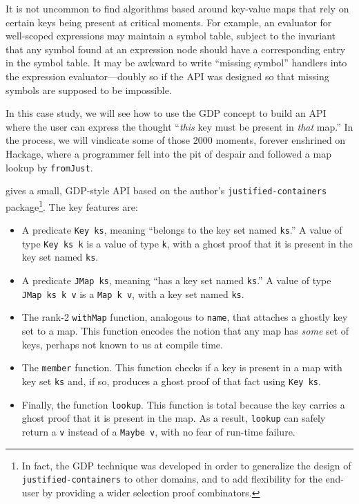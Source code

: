 \documentclass[format=sigplan, review=false, screen=true, 10pt]{acmart}
\begin{document}
It is not uncommon to find algorithms based around key-value maps that rely
on certain keys being present at critical moments. For example, an evaluator for
well-scoped expressions may maintain a symbol table, subject to the
invariant that any symbol found at an expression node should have a corresponding entry in the
symbol table. It may be awkward to write ``missing symbol'' handlers into the expression
evaluator---doubly so if the API was designed so that missing symbols are supposed to
be impossible.

In this case study, we will see how to use the GDP concept to build an API where the
user can express the thought ``\emph{this} key must be present in \emph{that} map.''
In the process, we will vindicate  some of those
2000 moments, forever enshrined on Hackage, where a programmer fell into
the pit of despair and followed a map lookup by \texttt{fromJust}.

 gives a small, GDP-style API based on the author's
\texttt{justified-containers}
package\footnote{In fact, the GDP technique was developed in order to generalize the
  design of \texttt{justified-containers} to other domains, and to add flexibility
  for the end-user by providing a wider selection proof combinators.}. The key features are:
\begin{itemize}
\item A predicate \texttt{Key ks}, meaning ``belongs to the key set named \texttt{ks}.''
  A value of type \texttt{Key ks k} is a value of type \texttt{k}, with a ghost proof
  that it is present in the key set named \texttt{ks}.
\item A predicate \texttt{JMap ks}, meaning ``has a key set named \texttt{ks}.'' A value
  of type \texttt{JMap ks k v} is a \texttt{Map k v}, with a key set named \texttt{ks}.
\item The rank-2 \texttt{withMap} function, analogous to \texttt{name}, that attaches
  a ghostly key set to a map. This function encodes the notion that any map has
  \emph{some} set of keys, perhaps not known to us at compile time.
\item The \texttt{member} function. This function checks if a key is present in a map
  with key set \texttt{ks} and,
  if so, produces a ghost proof of that fact using \texttt{Key ks}.
\item Finally, the function \texttt{lookup}. This function is total because the
  key carries a ghost proof that it is present in the map. As a result, \texttt{lookup}
  can safely return
  a \texttt{v} instead of a \texttt{Maybe v}, with no fear of run-time failure.
\end{itemize}
\end{document}
